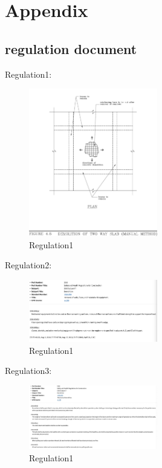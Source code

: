 \section*{Appendix}
\label{sec:appendix}
\subsection{regulation document}
\label{sec:regulation_document}
Regulation1: 
\begin{figure}
    \centering
    \includegraphics[width=0.5\textwidth]{figures/Demolition-of-Two-way-slab.jpeg}
    \caption{Regulation1}
    \label{fig:regulation1}
\end{figure}
Regulation2: 
\begin{figure}
    \centering
    \includegraphics[width=0.5\textwidth]{figures/Removal-of-walls-floors-and-material-with-equipment.png}
    \caption{Regulation1}
    \label{fig:regulation1}
\end{figure}
Regulation3: 
\begin{figure}
    \centering
    \includegraphics[width=0.5\textwidth]{figures/mechanical-demolition.jpeg}
    \caption{Regulation1}
    \label{fig:regulation1}
\end{figure}
